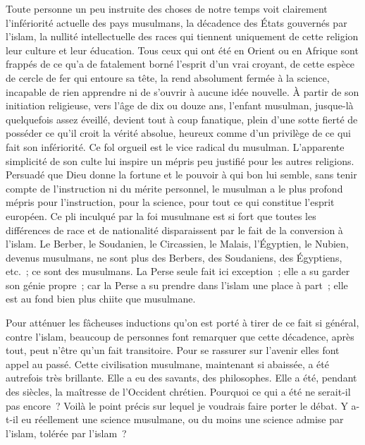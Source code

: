 \documentclass[french,twoside]{book} %
\newcommand\orgName[1]{#1}
\newcommand\persName[1]{#1}
\newcommand\placeName[1]{#1}
\begin{document}
Toute personne un peu instruite des choses de notre temps voit clairement l’infériorité actuelle des pays musulmans, la décadence des États gouvernés par l’islam, la nullité intellectuelle des races qui tiennent uniquement de cette religion leur culture et leur éducation. Tous ceux qui ont été en {\placeName Orient} ou en {\placeName Afrique} sont frappés de ce qu’a de fatalement borné l’esprit d’un vrai croyant, de cette espèce de cercle de fer qui entoure sa tête, la rend absolument fermée à la science, incapable de rien apprendre ni de s’ouvrir à aucune idée nouvelle. À partir de son initiation religieuse, vers l’âge de dix ou douze ans, l’enfant musulman, jusque-là quelquefois assez éveillé, devient tout à coup fanatique, plein d’une sotte fierté de posséder ce qu’il croit la vérité absolue, heureux comme d’un privilège de ce qui fait son infériorité. Ce fol orgueil est le vice radical du musulman. L’apparente simplicité de son culte lui inspire un mépris peu justifié pour les autres religions. Persuadé que {\persName Dieu} donne la fortune et le pouvoir à qui bon lui semble, sans tenir compte de l’instruction ni du mérite personnel, le musulman a le plus profond mépris pour l’instruction, pour la science, pour tout ce qui constitue l’esprit européen. Ce pli inculqué par la foi musulmane est si fort que toutes les différences de race et de nationalité disparaissent par le fait de la conversion à l’islam. Le Berber, le Soudanien, le Circassien, le Malais, l’Égyptien, le Nubien, devenus musulmans, ne sont plus des Berbers, des Soudaniens, des Égyptiens, etc. ; ce sont des musulmans. La {\orgName Perse} seule fait ici exception ; elle a su garder son génie propre ; car la {\orgName Perse} a su prendre dans l’islam une place à part ; elle est au fond bien plus chiite que musulmane.\par
Pour atténuer les fâcheuses inductions qu’on est porté à tirer de ce fait si général, contre l’islam, beaucoup de personnes font remarquer que cette décadence, après tout, peut n’être qu’un fait transitoire. Pour se rassurer sur l’avenir elles font appel au passé. Cette civilisation musulmane, maintenant si abaissée, a été autrefois très brillante. Elle a eu des savants, des philosophes. Elle a été, pendant des siècles, la maîtresse de l’{\placeName Occident chrétien}. Pourquoi ce qui a été ne serait-il pas encore ? Voilà le point précis sur lequel je voudrais faire porter le débat. Y a-t-il eu réellement une science musulmane, ou du moins une science admise par l’islam, tolérée par l’islam ?\par
\end{document}
